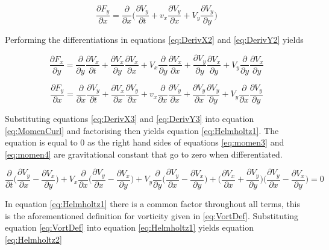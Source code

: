 \begin{equation}
\label{eq:DerivY2}
\frac{\partial F_y}{\partial x} = \frac{\partial}{\partial x}\Big(\frac{\partial V_y}{\partial t}+v_x \frac{\partial V_y}{\partial x}+V_y \frac{\partial V_y}{\partial y}\Big)
\end{equation}

Performing the differentiations in equations \ref{eq:DerivX2} and \ref{eq:DerivY2} yields

\begin{equation}
\label{eq:DerivX3}
\frac{\partial F_x}{\partial y}=\frac{\partial}{\partial y}\frac{\partial V_x}{\partial t}+\frac{\partial V_x}{\partial y}\frac{\partial V_x}{\partial x}+V_x\frac{\partial}{\partial y}\frac{\partial V_x}{\partial x}+\frac{\partial V_y}{\partial y}\frac{\partial V_x}{\partial y}+V_y\frac{\partial}{\partial y}\frac{\partial V_x}{\partial y}
\end{equation}

\begin{equation}
\label{eq:DerivY3}
\frac{\partial F_y}{\partial x}=\frac{\partial}{\partial x}\frac{\partial V_y}{\partial t}+\frac{\partial V_x}{\partial x}\frac{\partial V_y}{\partial x}+v_x\frac{\partial}{\partial x}\frac{\partial V_y}{\partial x}+\frac{\partial V_y}{\partial  x}\frac{\partial V_y}{\partial y}+V_y\frac{\partial}{\partial x}\frac{\partial V_y}{\partial y}
\end{equation}

Substituting equations \ref{eq:DerivX3} and \ref{eq:DerivY3} into equation \ref{eq:MomenCurl} and factorising then yields equation \ref{eq:Helmholtz1}. The equation is equal to $0$ as the right hand sides of equations \ref{eq:momen3} and \ref{eq:momen4} are gravitational constant that go to zero when differentiated.


\begin{equation}
\label{eq:Helmholtz1}
\frac{\partial}{\partial t}\Big(\frac{\partial V_y}{\partial x}-\frac{\partial V_x}{\partial y}\Big)+V_x\frac{\partial}{\partial x}\Big(\frac{\partial V_y}{\partial x}-\frac{\partial V_x}{\partial y}\Big)+V_y\frac{\partial}{\partial y}\Big(\frac{\partial V_y}{\partial x}-\frac{\partial V_x}{\partial y}\Big)+\Big(\frac{\partial V_x}{\partial x}+\frac{\partial V_y}{\partial y}\Big)\Big(\frac{\partial V_y}{\partial x}-\frac{\partial V_x}{\partial y}\Big)=0
\end{equation}

In equation \ref{eq:Helmholtz1} there is a common factor throughout all terms, this is the aforementioned definition for vorticity given in \ref{eq:VortDef}. Substituting equation \ref{eq:VortDef} into equation \ref{eq:Helmholtz1} yields equation \ref{eq:Helmholtz2}

